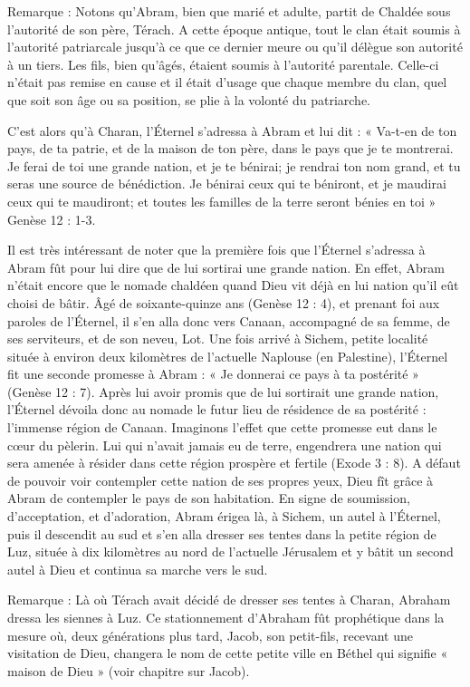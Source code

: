 Remarque : Notons qu'Abram, bien que marié et adulte, partit de Chaldée sous l'autorité de son père, Térach. A cette époque antique, tout le clan était soumis à l'autorité patriarcale jusqu'à ce que ce dernier meure ou qu'il délègue son autorité à un tiers. Les fils, bien qu'âgés, étaient soumis à l'autorité parentale. Celle-ci n'était pas remise en cause et il était d'usage que chaque membre du clan, quel que soit son âge ou sa position, se plie à la volonté du patriarche.

C'est alors qu'à Charan, l’Éternel s'adressa à Abram et lui dit : « Va-t-en de ton pays, de ta patrie, et de la maison de ton père, dans le pays que je te montrerai. Je ferai de toi une grande nation, et je te bénirai; je rendrai ton nom grand, et tu seras une source de bénédiction. Je bénirai ceux qui te béniront, et je maudirai ceux qui te maudiront; et toutes les familles de la terre seront bénies en toi » Genèse 12 : 1-3.

Il est très intéressant de noter que la première fois que l’Éternel s'adressa à Abram fût pour lui dire que de lui sortirai une grande nation. En effet, Abram n'était encore que le nomade chaldéen quand Dieu vit déjà en lui nation qu'il eût choisi de bâtir.
Âgé de soixante-quinze ans (Genèse 12 : 4), et prenant foi aux paroles de l’Éternel, il s'en alla donc vers Canaan, accompagné de sa femme, de ses serviteurs, et de son neveu, Lot. Une fois arrivé à Sichem, petite localité située à environ deux kilomètres de l'actuelle Naplouse (en Palestine), l’Éternel fit une seconde promesse à Abram : « Je donnerai ce pays à ta postérité » (Genèse 12 : 7). Après lui avoir promis que de lui sortirait une grande nation, l’Éternel dévoila donc au nomade le futur lieu de résidence de sa postérité : l'immense région de Canaan. Imaginons l'effet que cette promesse eut dans le cœur du pèlerin. Lui qui n'avait jamais eu de terre, engendrera une nation qui sera amenée à résider dans cette région prospère et fertile (Exode 3 : 8). A défaut de pouvoir voir contempler cette nation de ses propres yeux, Dieu fît grâce à Abram de contempler le pays de son habitation. En signe de soumission, d'acceptation, et d'adoration, Abram érigea là, à Sichem, un autel à l’Éternel, puis il descendit au sud et s'en alla dresser ses tentes dans la petite région de Luz, située à dix kilomètres au nord de l'actuelle Jérusalem et y bâtit un second autel à Dieu et continua sa marche vers le sud.

Remarque : Là où Térach avait décidé de dresser ses tentes à Charan, Abraham dressa les siennes à Luz. Ce stationnement d'Abraham fût prophétique dans la mesure où, deux générations plus tard, Jacob, son petit-fils, recevant une visitation de Dieu, changera le nom de cette petite ville en Béthel qui signifie « maison de Dieu » (voir chapitre sur Jacob).

